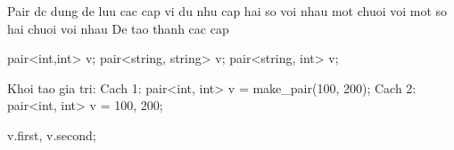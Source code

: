     Pair dc dung de luu cac cap vi du nhu
        cap hai so voi nhau
        mot chuoi voi mot so
        hai chuoi voi nhau
    De tao thanh cac cap

    pair<int,int> v;
    pair<string, string> v;
    pair<string, int> v;

    Khoi tao gia tri:
        Cach 1:
            pair<int, int> v = make_pair(100, 200);
        Cach 2:
            pair<int, int> v = {100, 200};

    v.first, v.second;